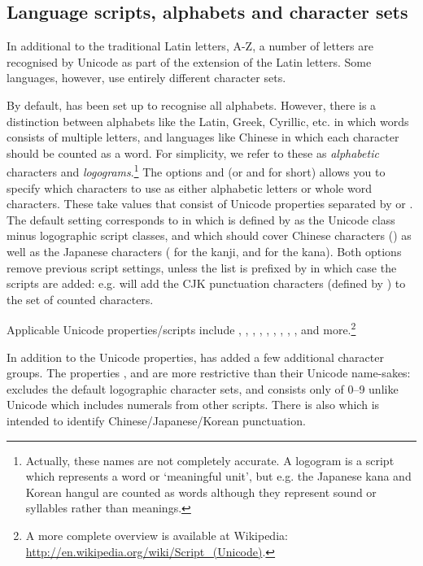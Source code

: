 \documentclass{article}
\begin{document}
\subsection{Language scripts, alphabets and character sets}

In additional to the traditional Latin letters, A-Z, a number of letters are recognised by Unicode as part of the extension of the Latin letters. Some languages, however, use entirely different character sets.

By default, \TeXcount{} has been set up to recognise all alphabets. However, there is a distinction between alphabets like the Latin, Greek, Cyrillic, etc. in which words consists of multiple letters, and languages like Chinese in which each character should be counted as a word. For simplicity, we refer to these as \emph{alphabetic} characters and \emph{logograms}.\footnote{%
Actually, these names are not completely accurate. A logogram is a script which represents a word or `meaningful unit', but e.g. the Japanese kana and Korean hangul are counted as words although they represent sound or syllables rather than meanings.}
The options  and  (or  and  for short) allows you to specify which characters to use as either alphabetic letters or whole word characters. These take values that consist of Unicode properties separated by \code{,} or \code{+}. The default setting corresponds to
in which  is defined by \TeXcount{} as the Unicode  class minus logographic script classes, and
which should cover Chinese characters () as well as the Japanese characters ( for the kanji,  and  for the kana). Both options remove previous script settings, unless the list is prefixed by \code{+} in which case the scripts are added: e.g.  will add the CJK punctuation characters (defined by \TeXcount) to the set of counted characters.

Applicable Unicode properties/scripts include , , , , , , , , , and more.\footnote{A more complete overview is available at Wikipedia: \url{http://en.wikipedia.org/wiki/Script_(Unicode)}.}

In addition to the Unicode properties, \TeXcount{} has added a few additional character groups. The properties ,  and  are more restrictive than their Unicode name-sakes:  excludes the default logographic character sets, and  consists only of 0--9 unlike Unicode  which includes numerals from other scripts. There is also  which is intended to identify Chinese/Japanese/Korean punctuation.
\end{document}
